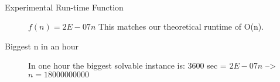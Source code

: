 \documentclass[paper=a4, fontsize=11pt]{scrartcl} %
\numberwithin{equation}{section} %
\numberwithin{figure}{section} %
\numberwithin{table}{section} %
\begin{document}
\begin{description}
    \item \hfill \\
    \begin{description}
        \item[Experimental Run-time Function]  $f(n) = 2E-07n$ This matches our theoretical runtime of O(n). \\
        \item[Biggest n in an hour] In one hour the biggest solvable instance is: 3600 sec = $2E-07n$ --> $n = 18000000000$ \\
    \end{description}
\end{description}
\end{document}
